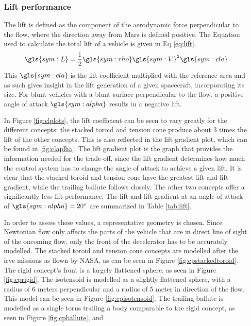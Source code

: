 \subsubsection{Lift performance}
The lift is defined as the component of the aerodynamic force perpendicular to the flow, where the direction away from Mars is defined positive. The Equation used to calculate the total lift of a vehicle is given in Eq \ref{eq:lift}.
\begin{equation}
\gls{sym:L} = \frac{1}{2}\gls{sym:rho}\gls{sym:V}^2\gls{sym:cla}
\label{eq:lift}
\end{equation}
This $\gls{sym:cla}$ is the lift coefficient multiplied with the reference area and as such gives insight in the lift generation of a given spacecraft, incorporating its size. For blunt vehicles with a blunt surface perpendicular to the flow, a positive angle of attack $\gls{sym:alpha}$ results in a negative lift.

In Figure \ref{fig:clplots}, the lift coefficient can be seen to vary greatly for the different concepts: the stacked toroid and tension cone produce about 3 times the lift of the other concepts. This is also reflected in the lift gradient plot, which can be found in \ref{fig:claplha}. The lift gradient plot is the graph that provides the information needed for the trade-off, since the lift gradient determines how much the control system has to change the angle of attack to achieve a given lift. It is clear that the stacked toroid and tension cone have the greatest lift and lift gradient, while the trailing ballute follows closely. The other two concepts offer a significantly less lift performance. The lift and lift gradient at an angle of attack of $\gls{sym:alpha}=20^\circ$ are summarized in Table \ref{tab:lift}.

In order to assess these values, a representative geometry is chosen. Since Newtonian flow only affects the parts of the vehicle that are in direct line of sight of the oncoming flow, only the front of the decelerator has to be accurately modelled. The stacked toroid and tension cone concepts are modelled after the \gls{irve} missions as flown by NASA, as can be seen in Figure \ref{fig:cpstackedtoroid}. The rigid concept's front is a largely flattened sphere, as seen in Figure \ref{fig:cprigid}. The isotensoid is modelled as a slightly flattened sphere, with a radius of 6 meters perpendicular and a radius of 5 meter in direction of the flow. This model can be seen in Figure \ref{fig:cpisotensoid}. The trailing ballute is modelled as a single torus trailing a body comparable to the rigid concept, as seen in Figure \ref{fig:cpballute}, and 



